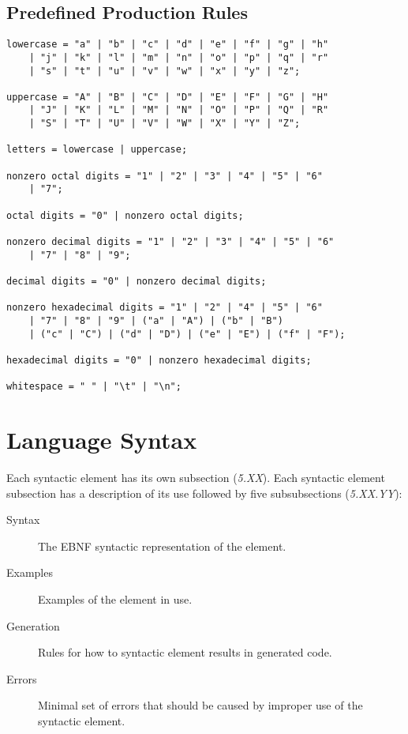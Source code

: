 \documentclass[10pt,a4paper]{article}
\begin{document}
\subsection{Predefined Production Rules}
\begin{verbatim}
lowercase = "a" | "b" | "c" | "d" | "e" | "f" | "g" | "h"
    | "j" | "k" | "l" | "m" | "n" | "o" | "p" | "q" | "r"
    | "s" | "t" | "u" | "v" | "w" | "x" | "y" | "z";

uppercase = "A" | "B" | "C" | "D" | "E" | "F" | "G" | "H"
    | "J" | "K" | "L" | "M" | "N" | "O" | "P" | "Q" | "R"
    | "S" | "T" | "U" | "V" | "W" | "X" | "Y" | "Z";

letters = lowercase | uppercase;

nonzero octal digits = "1" | "2" | "3" | "4" | "5" | "6"
    | "7";

octal digits = "0" | nonzero octal digits;

nonzero decimal digits = "1" | "2" | "3" | "4" | "5" | "6"
    | "7" | "8" | "9";

decimal digits = "0" | nonzero decimal digits;

nonzero hexadecimal digits = "1" | "2" | "4" | "5" | "6"
    | "7" | "8" | "9" | ("a" | "A") | ("b" | "B")
    | ("c" | "C") | ("d" | "D") | ("e" | "E") | ("f" | "F");

hexadecimal digits = "0" | nonzero hexadecimal digits;

whitespace = " " | "\t" | "\n";
\end{verbatim}
\newpage




\section{Language Syntax}
Each syntactic element has its own subsection (\textit{5.XX}). Each syntactic element subsection has a description of its use followed by five subsubsections (\textit{5.XX.YY}):
\begin{description}
  \item[Syntax] The EBNF syntactic representation of the element.
  \item[Examples] Examples of the element in use.
  \item[Generation] Rules for how to syntactic element results in generated code.
  \item[Errors] Minimal set of errors that should be caused by improper use of the syntactic element.
\end{description}
\end{document}
